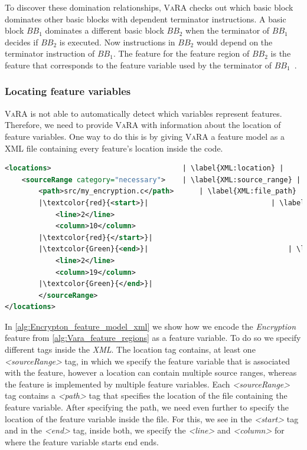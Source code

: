 To discover these domination relationships, \textsc{VaRA} checks out which basic block dominates other basic blocks with dependent terminator instructions. 
A basic block $BB_1$ dominates a different basic block $BB_2$ when the terminator of $BB_1$ decides if $BB_2$ is executed. 
Now instructions in $BB_2$ would depend on the terminator instruction of $BB_1$. 
The feature for the feature region of $BB_2$ is the feature that corresponds to the feature variable used by the terminator of $BB_1$~\cite{VaRA-Tom}.

\subsubsection{Locating feature variables}
\textsc{VaRA} is not able to automatically detect which variables represent features. 
Therefore, we need to provide \textsc{VaRA} with information about the location of feature variables. One way to do this is by giving \textsc{VaRA}
a feature model as a \textsc{XML} file containing every feature's location inside the code.

\begin{minipage}{\linewidth}
\begin{lstlisting}[caption={Feature model of \autoref{alg:Vara_feature_regions} in XML. The start of a feature variable is highlighted in red and the
    end is highlighted in green.},
    language=XML,label={alg:Encrypton_feature_model_xml},escapechar=|, captionpos=b]
<locations>                               | \label{XML:location} |
    <sourceRange category="necessary">    | \label{XML:source_range} |
        <path>src/my_encryption.c</path>      | \label{XML:file_path} |
        |\textcolor{red}{<start>}|                             | \label{XML:start_variable} |
            <line>2</line>
            <column>10</column>
        |\textcolor{red}{</start>}| 
        |\textcolor{Green}{<end>}|                                 | \label{XML:end_variable} |
            <line>2</line>
            <column>19</column>
        |\textcolor{Green}{</end>}|
        </sourceRange>
</locations>
\end{lstlisting}
\end{minipage}

In \autoref{alg:Encrypton_feature_model_xml} we show how we encode the \emph{Encryption} feature from \autoref{alg:Vara_feature_regions} as a
feature variable. To do so we specify different tags inside the \emph{XML}.
The location tag contains, at least one \emph{<sourceRange>} tag, in which we specify the feature variable that is associated with the feature, 
however a location can contain multiple source ranges, whereas the feature is implemented by multiple feature variables.
Each \emph{<sourceRange>} tag contains a \emph{<path>} tag that specifies the location of the file containing the feature variable.
After specifying the path, we need even further to specify the location of the feature variable inside the file. 
For this, we see in  the \emph{<start>} tag and in  the \emph{<end>} tag, 
inside both, we specify the \emph{<line>} and \emph{<column>} for where the feature variable starts end ends. 

